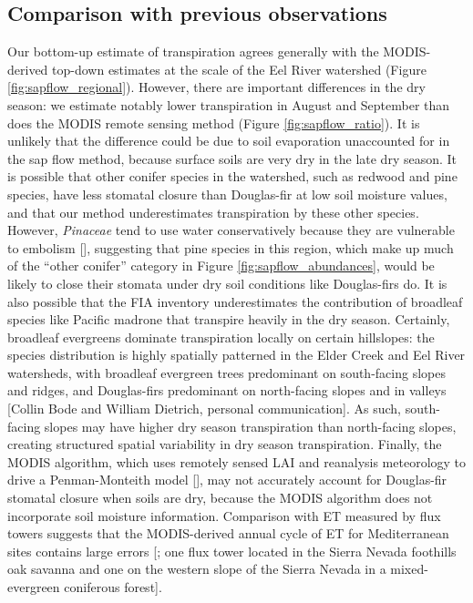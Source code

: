 \subsection{Comparison with previous observations}
Our bottom-up estimate of transpiration agrees generally with the MODIS-derived top-down estimates at the scale of the Eel River watershed (Figure \ref{fig:sapflow_regional}).  However, there are important differences in the dry season: we estimate notably lower transpiration in August and September than does the MODIS remote sensing method (Figure \ref{fig:sapflow_ratio}).  It is unlikely that the difference could be due to soil evaporation unaccounted for in the sap flow method, because surface soils are very dry in the late dry season.  It is possible that other conifer species in the watershed, such as redwood and pine species, have less stomatal closure than Douglas-fir at low soil moisture values, and that our method underestimates transpiration by these other species.  However, \textit{Pinaceae} tend to use water conservatively because they are vulnerable to embolism [\cite{martinez2004hydraulic}], suggesting that pine species in this region, which make up much of the ``other conifer'' category in Figure \ref{fig:sapflow_abundances}, would be likely to close their stomata under dry soil conditions like Douglas-firs do.  It is also possible that the FIA inventory underestimates the contribution of broadleaf species like Pacific madrone that transpire heavily in the dry season.  Certainly, broadleaf evergreens dominate transpiration locally on certain hillslopes: the species distribution is highly spatially patterned in the Elder Creek and Eel River watersheds, with broadleaf evergreen trees predominant on south-facing slopes and ridges, and Douglas-firs predominant on north-facing slopes and in valleys [Collin Bode and William Dietrich, personal communication].  As such, south-facing slopes may have higher dry season transpiration than north-facing slopes, creating structured spatial variability in dry season transpiration.  Finally, the MODIS algorithm, which uses remotely sensed LAI and reanalysis meteorology to drive a Penman-Monteith model [\cite{mu2007development}], may not accurately account for Douglas-fir stomatal closure when soils are dry, because the MODIS algorithm does not incorporate soil moisture information.  Comparison with ET measured by flux towers suggests that the MODIS-derived annual cycle of ET for Mediterranean sites contains large errors [\cite{vinukollu2010global}; one flux tower located in the Sierra Nevada foothills oak savanna and one on the western slope of the Sierra Nevada in a mixed-evergreen coniferous forest].

